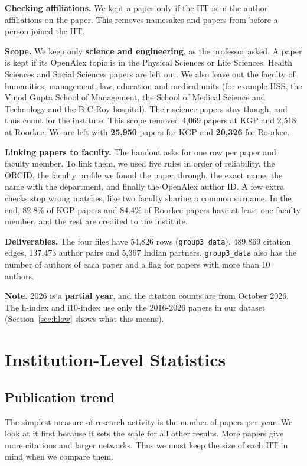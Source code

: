 \documentclass[conference,10pt]{IEEEtran}
\begin{document}
\textbf{Checking affiliations.} We kept a paper only if the IIT is in the author affiliations on the paper. This removes namesakes and papers from before a person joined the IIT.

\textbf{Scope.} We keep only \textbf{science and engineering}, as the professor asked. A paper is kept if its OpenAlex topic is in the Physical Sciences or Life Sciences. Health Sciences and Social Sciences papers are left out. We also leave out the faculty of humanities, management, law, education and medical units (for example HSS, the Vinod Gupta School of Management, the School of Medical Science and Technology and the B C Roy hospital). Their science papers stay though, and thus count for the institute. This scope removed 4,069 papers at KGP and 2,518 at Roorkee. We are left with
\textbf{25,950} papers for KGP and \textbf{20,326} for Roorkee.

\textbf{Linking papers to faculty.} The handout asks for one row per paper and faculty member. To link them, we used five rules in order of reliability, the ORCID, the faculty profile we found the paper through, the exact name, the name with the department, and finally the OpenAlex author ID. A few extra checks stop wrong matches, like two faculty sharing a common surname. In the end, 82.8\% of KGP papers and 84.4\% of Roorkee papers have at least one faculty member, and the rest are credited to the institute.

\textbf{Deliverables.} The four files have 54,826 rows (\texttt{group3\_data}), 489,869 citation edges, 137,473
author pairs and 5,367 Indian partners. \texttt{group3\_data} also has the number of authors of each paper and a flag
for papers with more than 10 authors.

\textbf{Note.} 2026 is a \textbf{partial year}, and the citation counts are from October 2026. The h-index and
i10-index use only the 2016-2026 papers in our dataset (Section~\ref{sec:hlow} shows what this means).

\section{Institution-Level Statistics}\label{sec:inst}
\subsection{Publication trend}
The simplest measure of research activity is the number of papers per year. We look at it first because it
sets the scale for all other results. More papers give more citations and larger networks. Thus we must keep the size
of each IIT in mind when we compare them.
\end{document}
